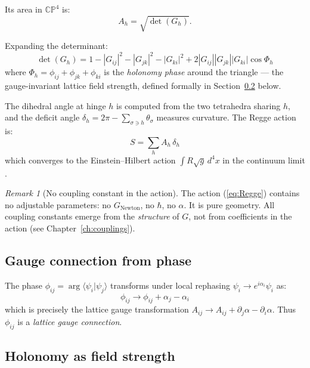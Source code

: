 \documentclass[12pt]{article}
\theoremstyle{remark}
\newtheorem{remark}[theorem]{Remark}
\theoremstyle{definition}
\begin{document}
Its area in $\mathbb{CP}^4$ is:
\begin{equation}
A_h = \sqrt{\det(G_h)}.
\end{equation}

Expanding the determinant:
\begin{equation}
\det(G_h) = 1 - |G_{ij}|^2 - |G_{jk}|^2 - |G_{ki}|^2 + 2|G_{ij}||G_{jk}||G_{ki}|\cos\Phi_h
\label{eq:detGh}
\end{equation}
where $\Phi_h = \phi_{ij} + \phi_{jk} + \phi_{ki}$ is the \emph{holonomy phase} around the triangle --- the gauge-invariant lattice field strength, defined formally in Section~\ref{sec:holonomy} below.

The dihedral angle at hinge $h$ is computed from the two tetrahedra sharing $h$, and the deficit angle $\delta_h = 2\pi - \sum_{\sigma \ni h} \theta_\sigma$ measures curvature. The Regge action is:
\begin{equation}
\boxed{S = \sum_h A_h\,\delta_h}
\label{eq:Regge}
\end{equation}
which converges to the Einstein--Hilbert action $\int R\sqrt{g}\,d^4x$ in the continuum limit \cite{Regge}.

\begin{remark}[No coupling constant in the action]
The action (\ref{eq:Regge}) contains no adjustable parameters: no $G_\text{Newton}$, no $\hbar$, no $\alpha$. It is pure geometry. All coupling constants emerge from the \emph{structure} of $G$, not from coefficients in the action (see Chapter~\ref{ch:couplings}).
\end{remark}

\subsection{Gauge connection from phase}
\label{sec:gauge_connection}

The phase $\phi_{ij} = \arg\langle\psi_i|\psi_j\rangle$ transforms under local rephasing $\psi_i \to e^{i\alpha_i}\psi_i$ as:
\begin{equation}
\phi_{ij} \to \phi_{ij} + \alpha_j - \alpha_i
\end{equation}
which is precisely the lattice gauge transformation $A_{ij} \to A_{ij} + \partial_j\alpha - \partial_i\alpha$. Thus $\phi_{ij}$ is a \emph{lattice gauge connection}.

\subsection{Holonomy as field strength}
\label{sec:holonomy}
\end{document}

